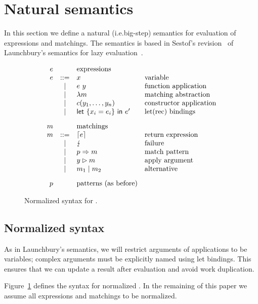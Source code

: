 \section{Natural semantics}\label{sec:bigstep}

In this section we define a natural (i.e.\@ big-step) semantics for
evaluation of expressions and matchings.  The semantics is based in
Sestof's revision~\cite{sestof_1997} of Launchbury's semantics for
lazy evaluation~\cite{launchbury_1993}.

\begin{figure}
  \[
    \begin{array}{rcll}
      e & &     \text{expressions} \\
      e & ::= &  x  & \text{variable} \\
      & | &  e~y & \text{function application} \\
      & | & \lambda m & \text{matching abstraction} \\
      & | & c(y_1,\ldots,y_n) & \text{constructor application} \\
      & | & \textsf{let}~\{x_i=e_i\}~\textsf{in}~e' & \text{let(rec) bindings} \\[2ex]
      m &  & \text{matchings} \\
      m & ::= & \left\lceil e\right\rceil & \text{return expression}\\
      & | & \lightning & \text{failure} \\
      & | & p \Rightarrow m & \text{match pattern} \\
      & | & y\rhd m & \text{apply argument}\\
      & | & m_1 \mid m_2 & \text{alternative}\\[2ex]
      p & & \text{patterns (as before)}
  \end{array}
\]
\caption{Normalized syntax for \lambdaPMC.}\label{fig:syntax-normalized}
\end{figure}

\subsection{Normalized syntax}
As in Launchbury's semantics, we will restrict arguments of
applications to be variables; complex arguments must be explicitly
named using let bindings.  This ensures that we can update a result
after evaluation and avoid work duplication.

Figure~\ref{fig:syntax-normalized} defines the syntax for normalized
\lambdaPMC. In the remaining of this paper we assume all expressions
and matchings to be normalized.

